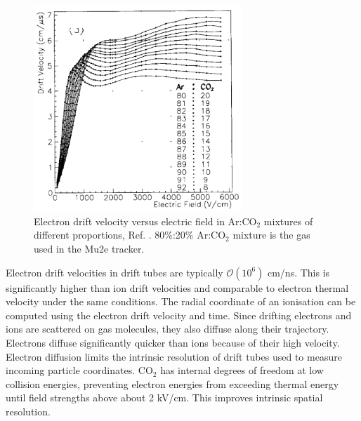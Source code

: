 \begin{figure}[!h]
    \centering
    \includegraphics[width =0.7\textwidth]{figures/png/Screenshot_20240330_102206.png}
    \caption{Electron drift velocity versus electric field in Ar:CO$_2$ mixtures of different proportions, Ref. \cite{ZHAO1994485}. 
    80\%:20\% Ar:CO$_2$ mixture is the gas used in the Mu2e tracker.}
    \label{fig:drift}
\end{figure}
Electron drift velocities in drift tubes are typically $\mathcal{O}(10^6)$ cm/ns.
This is significantly higher than ion drift velocities and comparable to electron thermal velocity under the same conditions. 
The radial coordinate of an ionisation can be computed using the electron drift velocity and time.
Since drifting electrons and ions are scattered on gas molecules, they also diffuse along their trajectory. 
Electrons diffuse significantly quicker than ions because of their high velocity. Electron diffusion limits 
the intrinsic resolution of drift tubes used to measure incoming particle coordinates. CO$_2$ has internal 
degrees of freedom at low collision energies, preventing electron energies from exceeding thermal energy until 
field strengths above about 2 kV/cm. This improves intrinsic spatial resolution.

